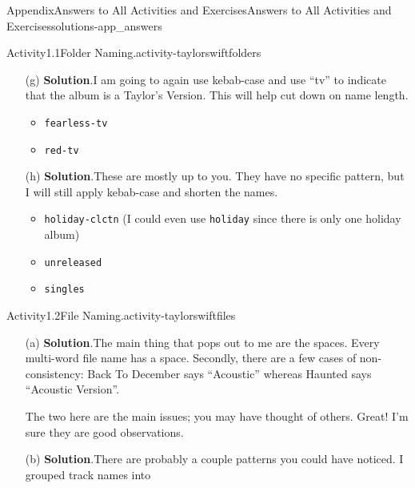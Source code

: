 \documentclass[oneside,10pt,]{book}
\newcommand{\blocktitlefont}{\relax}
\newcommand{\mono}[1]{\texttt{#1}}
\begin{document}
\begin{solutions-chapter}{Appendix}{Answers to All Activities and Exercises}{}{Answers to All Activities and Exercises}{}{}{solutions-app_answers}
\begin{activitysolution}{Activity}{1.1}{Folder Naming.}{activity-taylorswiftfolders}
\begin{enumerate}[font=\bfseries,label=(\alph*),ref=\alph*]
\begin{itemize}[label=\textbullet]
\item{}\mono{clear-chnl-live}%
\item{}\mono{speak-now-live}%
\end{itemize}
%
\item[(g)]\noindent\textbf{\blocktitlefont Solution}.\hypertarget{solution-taylorswiftfolders-j-b-back}{}\quad{}I am going to again use kebab-case and use ``tv'' to indicate that the album is a Taylor's Version. This will help cut down on name length.%
\begin{itemize}[label=\textbullet]
\item{}\mono{fearless-tv}%
\item{}\mono{red-tv}%
\end{itemize}
%
\item[(h)]\noindent\textbf{\blocktitlefont Solution}.\hypertarget{solution-taylorswiftfolders-k-b-back}{}\quad{}These are mostly up to you. They have no specific pattern, but I will still apply kebab-case and shorten the names.%
\begin{itemize}[label=\textbullet]
\item{}\mono{holiday-clctn} (I could even use \mono{holiday} since there is only one holiday album)%
\item{}\mono{unreleased}%
\item{}\mono{singles}%
\end{itemize}
%
\end{enumerate}%
\end{activitysolution}%
\begin{activitysolution}{Activity}{1.2}{File Naming.}{activity-taylorswiftfiles}%
\begin{enumerate}[font=\bfseries,label=(\alph*),ref=\alph*]%
\item[(a)]\noindent\textbf{\blocktitlefont Solution}.\hypertarget{solution-taylorswiftfiles-d-b-back}{}\quad{}The main thing that pops out to me are the spaces. Every multi-word file name has a space. Secondly, there are a few cases of non-consistency: Back To December says ``Acoustic'' whereas Haunted says ``Acoustic Version''.%
\par
The two here are the main issues; you may have thought of others. Great! I'm sure they are good observations.%
\item[(b)]\noindent\textbf{\blocktitlefont Solution}.\hypertarget{solution-taylorswiftgroups2-b-back}{}\quad{}There are probably a couple patterns you could have noticed. I grouped track names into%

\end{enumerate}
\end{activitysolution}
\end{solutions-chapter}
\end{document}
